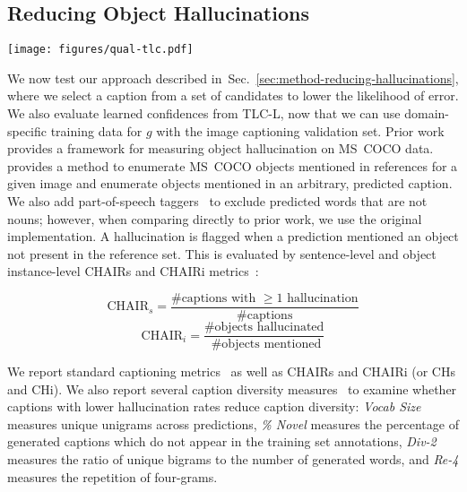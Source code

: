 \documentclass[10pt,twocolumn,letterpaper]{article}
\newcommand{\secref}[1]{Sec.\xspace~\ref{#1}}
\newcommand{\ApproachName}{TLC\xspace}
\newcommand{\OFALarge}{OFA$_{\text{Large}}$\xspace}
\begin{document}
\subsection{Reducing Object Hallucinations}
\label{sec:experiment-coco}

\begin{figure*}
  \centering
   \texttt{[image: figures/qual-tlc.pdf]}
   \caption{Qualitative examples from our test set in which \ApproachName-L avoided hallucinations in the original (Baseline) captions. In the rightmost column, we show cases where the MS~COCO object annotations did not exhaustively include all objects present. Captions are generated with \OFALarge and a beam size of 25, and $(b=i)$ refers to the index $i$ of the beam as ranked by the Baseline.
   }
   \label{fig:qual}
\end{figure*} 
We now test our approach described in~\secref{sec:method-reducing-hallucinations}, where we select a caption from a set of candidates to lower the likelihood of error. We also evaluate learned confidences from \ApproachName-L, now that we can use domain-specific training data for $g$ with the image captioning validation set. Prior work~\cite{rohrbach2018emnlp} provides a framework for measuring object hallucination on MS~COCO data. \cite{rohrbach2018emnlp} provides a method to enumerate MS~COCO objects mentioned in references for a given image and enumerate objects mentioned in an arbitrary, predicted caption. We also add part-of-speech taggers~\cite{bird2009natural,spacy} to exclude predicted words that are not nouns; however, when comparing directly to prior work, we use the original implementation. A hallucination is flagged when a prediction mentioned an object not present in the reference set. This is evaluated by sentence-level and object instance-level CHAIRs and CHAIRi metrics~\cite{rohrbach2018emnlp}:

\begin{equation}
\text{CHAIR}_s = \frac{\text{\# captions with $\geq 1$ hallucination}}{\text{\# captions}}
\label{eq:chairs}
\end{equation}
\begin{equation}
    \text{CHAIR}_i = \frac{\text{\# objects hallucinated}}{\text{ \# objects mentioned}}
    \label{eq:chairi}
\end{equation}


We report standard captioning metrics~\cite{anderson2016spice,vedantam2015cider} as well as CHAIRs and CHAIRi (or CHs and CHi). We also report several caption diversity measures~\cite{shetty2017speaking,xiong2018move} to examine whether captions with lower hallucination rates reduce caption diversity: \textit{Vocab Size} measures unique unigrams across predictions, \textit{\% Novel} measures the percentage of generated captions which do not appear in the training set annotations,
\textit{Div-2} measures the ratio of unique bigrams to the number of generated words,
and \textit{Re-4} measures the repetition of four-grams.
\end{document}
